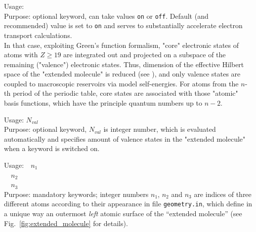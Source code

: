 
{
 \noindent 
 Usage:  \quad {} \\[1.0ex]
 Purpose: optional keyword,  can take values \texttt{on} or \texttt{off}.
 Default (and recommended) value is set to \texttt{on} and serves to substantially 
 accelerate electron transport calculations. \\ 
}
In that case, exploiting Green's function formalism, "core" electronic states of atoms 
with $Z \ge 19$ are integrated out and projected on a subspace of the 
remaining ("valence") electronic states. Thus, dimension of the effective Hilbert space 
of the "extended molecule" is reduced (see ), and only 
valence states are coupled to macroscopic reservoirs via model self-energies. For atoms 
from the $n$-th period of the periodic table, core states are associated with those 
"atomic" basis functions, which have the principle quantum numbers up to $n-2$.


{
 \noindent 
 Usage:  \quad $N_{val}$ \\[1.0ex]
 Purpose: optional keyword, $N_{val}$ is integer number, which is evaluated 
 au\-to\-ma\-ti\-cal\-ly and specifies amount of valence states in the "extended molecule"
 when a keyword  is switched on. \\ 
}


{
 \noindent Usage:\ \ $n_1$ \\ 
 \phantom{Usage:}\ \ $n_2$ \\ 
 \phantom{Usage:}\ \ $n_3$ \\[1.0ex] 
 Purpose: mandatory keywords; integer numbers $n_1$, $n_2$
 and $n_3$ are indices of three different atoms according to their
 appearance in file \texttt{geometry.in}, which define in a unique way
 an outermost \textit{left} atomic surface of the ``extended molecule''
 (see Fig.~\ref{fig:extended_molecule} for details). \\
}


